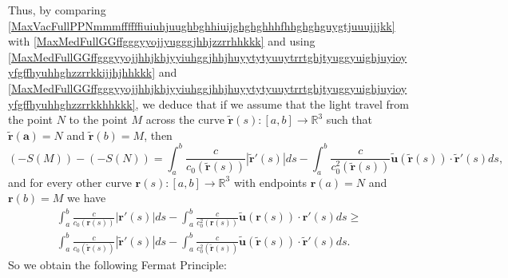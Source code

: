 \documentclass{article}
\theoremstyle{definition}
\theoremstyle{remark}
\renewcommand{\vec}[1]{\mathbf{#1}}
\newcommand{\er}{\eqref}
\newcommand{\er}{\eqref}
\begin{document}
Thus, by comparing
\er{MaxVacFullPPNmmmffffffiuiuhjuughbghhiuijghghghhhfhhghghguygtjuuujjjkk}
with \er{MaxMedFullGGffgggyyojjyugggjhhjzzrrhhkkk} and using
\er{MaxMedFullGGffgggyyojjhhjkhjyyiuhggjhhjhuyytytyuuytrrtghjtyuggyuighjuyioyyfgffhyuhhghzzrrkkijjhjhhkkk}
and
\er{MaxMedFullGGffgggyyojjhhjkhjyyiuhggjhhjhuyytytyuuytrrtghjtyuggyuighjuyioyyfgffhyuhhghzzrrkkhhkkk},
we deduce that if we assume that the light travel from the point $N$
to the point $M$ across the curve $\vec {\tilde
r}(s):[a,b]\to\mathbb{R}^3$ such that $\vec{\tilde r(a)}=N$ and
$\vec {\tilde r}(b)=M$, then
\begin{equation}\label{MaxMedFullGGffgggyyojjhhjkhjyyiuhggjhhjhuyytytyuuytrrtghjtyuggyuighjuyioyyfgffhyuhhghzzrrkkhhkkkhhh}
\left(-S(M)\right)-
\left(-S(N)\right)=\int_a^b\frac{c}{c_0\left(\vec{\tilde
r}(s)\right)}\left|\vec {\tilde
r}'(s)\right|ds-\int_a^b\frac{c}{c^2_0\left(\vec{\tilde
r}(s)\right)}\vec {\tilde u}\left(\vec{\tilde r}(s)\right)\cdot\vec
{\tilde r}'(s)ds,
\end{equation}
and for every other curve $\vec r(s):[a,b]\to\mathbb{R}^3$ with
endpoints $\vec r(a)=N$ and $\vec r(b)=M$ we have
\begin{multline}\label{MaxMedFullGGffgggyyojjhhjkhjyyiuhggjhhjhuyytytyuuytrrtghjtyuggyuighjuyioyyfgffhyuhhghzzrrkkhhkkkhhhjhkjhh}
\int_a^b\frac{c}{c_0\left(\vec r(s)\right)}\left|\vec
r'(s)\right|ds-\int_a^b\frac{c}{c^2_0\left(\vec r(s)\right)}\vec
{\tilde u}\left(\vec r(s)\right)\cdot\vec r'(s)ds\geq\\
\int_a^b\frac{c}{c_0\left(\vec{\tilde r}(s)\right)}\left|\vec
{\tilde r}'(s)\right|ds-\int_a^b\frac{c}{c^2_0\left(\vec{\tilde
r}(s)\right)}\vec {\tilde u}\left(\vec{\tilde r}(s)\right)\cdot\vec
{\tilde r}'(s)ds.
\end{multline}
So we obtain the following Fermat Principle:
\end{document}
